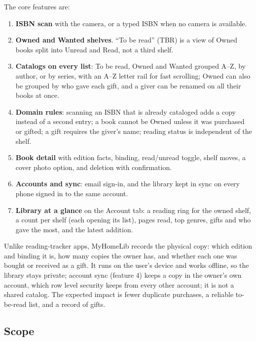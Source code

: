 \documentclass[12pt]{article}
\begin{document}
The core features are:
\begin{enumerate}
    \item \textbf{ISBN scan} with the camera, or a typed ISBN when no camera is available.
    \item \textbf{Owned and Wanted shelves}. ``To be read'' (TBR) is a view of Owned books split into Unread and Read, not a third shelf.
    \item \textbf{Catalogs on every list}: To be read, Owned and Wanted grouped A--Z, by author, or by series, with an A--Z letter rail for fast scrolling; Owned can also be grouped by who gave each gift, and a giver can be renamed on all their books at once.
    \item \textbf{Domain rules}: scanning an ISBN that is already cataloged adds a copy instead of a second entry; a book cannot be Owned unless it was purchased or gifted; a gift requires the giver's name; reading status is independent of the shelf.
    \item \textbf{Book detail} with edition facts, binding, read/unread toggle, shelf moves, a cover photo option, and deletion with confirmation.
    \item \textbf{Accounts and sync}: email sign-in, and the library kept in sync on every phone signed in to the same account.
    \item \textbf{Library at a glance} on the Account tab: a reading ring for the owned shelf, a count per shelf (each opening its list), pages read, top genres, gifts and who gave the most, and the latest addition.
\end{enumerate}

Unlike reading-tracker apps, MyHomeLib records the physical copy: which edition and binding it is, how many copies the owner has, and whether each one was bought or received as a gift. It runs on the user's device and works offline, so the library stays private; account sync (feature 4) keeps a copy in the owner's own account, which row level security keeps from every other account; it is not a shared catalog. The expected impact is fewer duplicate purchases, a reliable to-be-read list, and a record of gifts.

\subsection{Scope}
\end{document}
